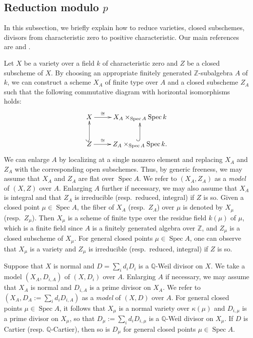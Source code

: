 \documentclass[12pt]{amsart}
\def\Spec{\operatorname{Spec}}
\newcommand{\Q}{\mathbb{Q}}
\newcommand{\Z}{\mathbb{Z}}
\theoremstyle{plain}
\theoremstyle{definition}
\theoremstyle{remark}
\newtheorem{defn and notation}[thm]{Definition and Notation}
\theoremstyle{plain}
\begin{document}
\subsection{Reduction modulo $p$}
In this subsection, we briefly explain how to reduce varieties, closed subschemes, divisors from characteristic zero to positive characteristic. 
Our main references are \cite{Hochster-Huneke20} and \cite{Mustata-Srinivas11}. 

Let $X$ be a variety over a field $k$ of characteristic zero and $Z$ be a closed subscheme of $X$.
By choosing an appropriate finitely generated $\Z$-subalgebra $A$ of $k$, we can construct a scheme $X_A$ of finite type over $A$ and a closed subscheme $Z_A$ such that the following commutative diagram with horizontal isomorphisms holds: 
\[\xymatrix{
X \ar[r]^{\cong \hspace*{3.5em}} &  X_A \times_{\Spec  A} \Spec  k\\
Z \ar[r]^{\cong \hspace*{3.5em}} \ar@{^{(}->}[u] & Z_{A} \times_{\Spec  A} \Spec  k. \ar@{^{(}->}[u]\\
}\]
We can enlarge $A$ by localizing at a single nonzero element and replacing $X_A$ and $Z_{A}$ with the corresponding open subschemes. 
Thus, by generic freeness, we may assume that $X_A$ and $Z_{A}$ are flat over $\Spec A$.
We refer to $(X_A, Z_A)$ as a \textit{model} of $(X, Z)$ over $A$.  
Enlarging $A$ further if necessary, we may also assume that $X_A$ is integral and that $Z_A$ is irreducible (resp.~reduced, integral) if $Z$ is so. 
Given a closed point $\mu \in \Spec A$, the fiber of $X_A$ (resp.~$Z_{A}$) over $\mu$ is denoted by $X_{\mu}$ (resp.~$Z_{\mu}$). 
Then $X_{\mu}$ is a scheme of finite type over the residue field $k(\mu)$ of $\mu$, which is a finite field since $A$ is a finitely generated algebra over $\mathbb{Z}$, and $Z_{\mu}$ is a closed subscheme of $X_{\mu}$.  
For general closed points $\mu \in \Spec A$, one can observe that $X_{\mu}$ is a variety and $Z_{\mu}$ is irreducible (resp.~reduced, integral) if $Z$ is so. 

Suppose that $X$ is normal and $D=\sum_i d_i D_i$ is a $\Q$-Weil divisor on $X$. 
We take a model $(X_A, D_{i,A})$ of $(X, D_i)$ over $A$. 
Enlarging $A$ if necessary, we may assume that $X_A$ is normal and $D_{i, A}$ is a prime divisor on $X_A$. 
We refer to $(X_A, D_A:=\sum_i d_i D_{i,A})$ as a \textit{model} of $(X, D)$ over $A$.   
For general closed points $\mu \in \Spec A$, it follows that $X_{\mu}$ is a normal variety over $\kappa(\mu)$ and $D_{i, \mu}$ is a prime divisor on $X_{\mu}$, so that $D_{\mu}:=\sum_i d_i D_{i, \mu}$ is a $\mathbb{Q}$-Weil divisor on $X_{\mu}$.  
If $D$ is Cartier (resp. $\Q$-Cartier), then so is $D_{\mu}$ for general closed points $\mu \in \Spec A$. 
\end{document}
